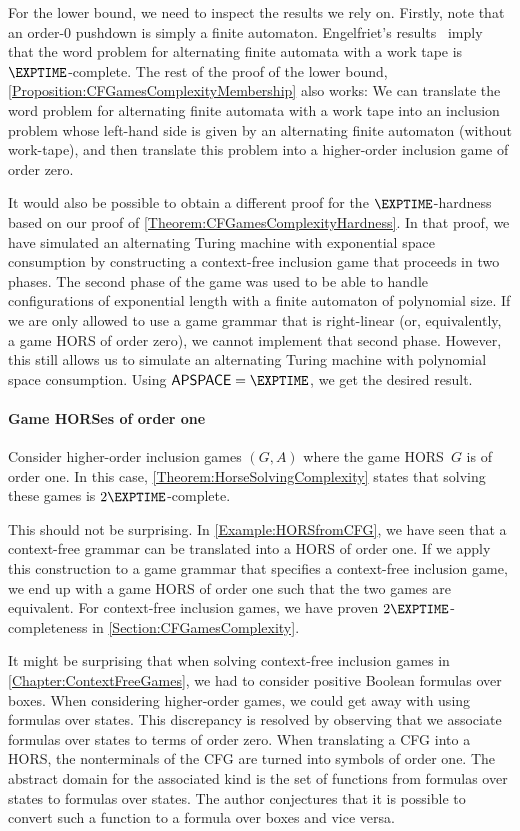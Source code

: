 \documentclass[../../diss.tex]{subfiles}
\begin{document}
For the lower bound, we need to inspect the results we rely on.
Firstly, note that an order-$0$ pushdown is simply a finite automaton.
Engelfriet's results~\cite{Engelfriet91} imply that the word problem for alternating finite automata with a work tape is $\EXPTIME$-complete.
The rest of the proof of the lower bound, \cref{Proposition:CFGamesComplexityMembership} also works:
We can translate the word problem for alternating finite automata with a work tape into an inclusion problem whose left-hand side is given by an alternating finite automaton (without work-tape), and then translate this problem into a higher-order inclusion game of order zero.

It would also be possible to obtain a different proof for the $\EXPTIME$-hardness based on our proof of \cref{Theorem:CFGamesComplexityHardness}.
In that proof, we have simulated an alternating Turing machine with exponential space consumption by constructing a context-free inclusion game that proceeds in two phases.
The second phase of the game was used to be able to handle configurations of exponential length with a finite automaton of polynomial size.
If we are only allowed to use a game grammar that is right-linear (or, equivalently, a game HORS of order zero), we cannot implement that second phase.
However, this still allows us to simulate an alternating Turing machine with polynomial space consumption.
Using $\mathsf{APSPACE} = \EXPTIME$, we get the desired result.

\paragraph{Game HORSes of order one}

Consider higher-order inclusion games $(G,A)$ where the game HORS~$G$ is of order one.
In this case, \cref{Theorem:HorseSolvingComplexity} states that solving these games is $2\EXPTIME$-complete.

This should not be surprising.
In \cref{Example:HORSfromCFG}, we have seen that a context-free grammar can be translated into a HORS of order one.
If we apply this construction to a game grammar that specifies a context-free inclusion game, we end up with a game HORS of order one such that the two games are equivalent.
For context-free inclusion games, we have proven $2\EXPTIME$-completeness in \cref{Section:CFGamesComplexity}.

It might be surprising that when solving context-free inclusion games in \cref{Chapter:ContextFreeGames}, we had to consider positive Boolean formulas over boxes.
When considering higher-order games, we could get away with using formulas over states.
This discrepancy is resolved by observing that we associate formulas over states to terms of order zero.
When translating a CFG into a HORS, the nonterminals of the CFG are turned into symbols of order one.
The abstract domain for the associated kind is the set of functions from formulas over states to formulas over states.
The author conjectures that it is possible to convert such a function to a formula over boxes and vice versa.
\end{document}
